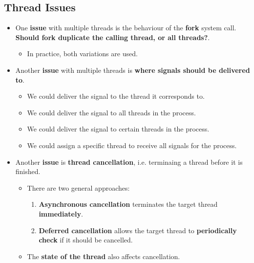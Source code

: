 \documentclass{article}
\begin{document}
\subsection*{Thread Issues}
\begin{itemize}
    \item One \textbf{issue} with multiple threads is the behaviour of the \textbf{fork} system call. \textbf{Should fork duplicate the calling thread, or all threads?}.
    \begin{itemize}
        \item In practice, both variations are used.
    \end{itemize}
    \item Another \textbf{issue} with multiple threads is \textbf{where signals should be delivered to}.
    \begin{itemize}
        \item We could deliver the signal to the thread it corresponds to.
        \item We could deliver the signal to all threads in the process.
        \item We could deliver the signal to certain threads in the process.
        \item We could assign a specific thread to receive all signals for the process.
    \end{itemize}
    \item Another \textbf{issue} is \textbf{thread cancellation}, i.e. terminaing a thread before it is finished.
    \begin{itemize}
        \item There are two general approaches:
        \begin{enumerate}
            \item \textbf{Asynchronous cancellation} terminates the target thread \textbf{immediately}.
            \item \textbf{Deferred cancellation} allows the target thread to \textbf{periodically check} if it should be cancelled.
        \end{enumerate}
        \item The \textbf{state of the thread} also affects cancellation.
    \end{itemize}
\end{itemize}
\end{document}
